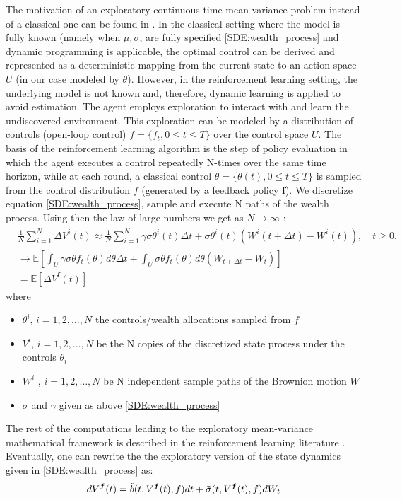 \documentclass[oneside, a4paper, onecolumn, 11pt]{article}
\begin{document}
The motivation of an exploratory continuous-time mean-variance problem instead of a classical one can be found in \cite{WangZariZhou2020}. In the classical setting where the model is fully known (namely when $\mu, \sigma$, are fully specified \eqref{SDE:wealth_process} and dynamic programming is applicable, the optimal control can be derived and represented as a deterministic mapping from the current state to an action space $U$ (in our case modeled by $\theta$).  However, in the reinforcement learning setting, the underlying model is not known and, therefore, dynamic learning is applied to avoid estimation. The agent employs exploration to interact with and learn the undiscovered environment. This exploration can be modeled by a distribution of controls (open-loop control) \( f = \{f_t, 0 \leq t \leq T\} \) over the control space $U$. The basis of the reinforcement learning algorithm is the step of policy evaluation in which the agent executes a control repeatedly N-times over the same time horizon, while at each round, a classical control $\theta = \{\theta(t), 0\leq t \leq T\}$ is sampled from the control distribution $f$ (generated by a feedback policy $\boldsymbol{f}$). We discretize equation \eqref{SDE:wealth_process}, sample and execute N paths of the wealth process. Using then the law of large numbers we get as $ N \to \infty$ \cite{WangZariZhou2020}:
\begin{align*} 
  &\frac{1}{N} \sum_{i=1}^{N} \Delta V^i(t)  \approx \frac{1}{N} \sum_{i=1}^{N} \gamma\sigma\theta^i(t) \Delta t + \sigma\theta^i(t)(W^i(t+\Delta t) - W^i(t)), \quad t \geq 0.\\
  &\to \mathbb{E}\left[\int_{U} \gamma\sigma\theta f_t(\theta) d\theta \Delta t + \int_{U} \sigma\theta f_t(\theta) d\theta \left(W_{t+\Delta t} - W_t\right)\right] \\
  & = \mathbb{E}\left[\Delta V^{\boldsymbol{f}}(t)\right]
\end{align*}
where 
\begin{itemize}
    \item $\theta^i$,  $i = 1, 2, \dots, N$ the controls/wealth allocations sampled from $f$
    \item $V^i$, $i = 1, 2, \dots, N$ be the  N copies of the discretized state process under the controls $\theta_i$
    \item $W^i$ , $i = 1, 2, \dots, N$ be N independent sample paths of the Brownion motion $W$
    \item $\sigma$ and $\gamma$ given as above \eqref{SDE:wealth_process}
\end{itemize}
The rest of the computations leading to the exploratory mean-variance mathematical framework is described in the reinforcement learning literature \cite{WangZariZhou2020}. Eventually, one can rewrite the the exploratory version of the state dynamics given in \eqref{SDE:wealth_process} as:
\begin{equation}
dV^{\boldsymbol{f}}(t) = \Tilde{b}(t, V^{\boldsymbol{f}}(t), f)dt + \Tilde{\sigma}(t, V^{\boldsymbol{f}}(t), f)dW_t  \label{eq:exploratory_state}  
\end{equation}
\end{document}

